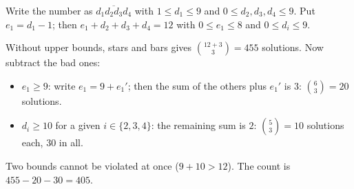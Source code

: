 Write the number as $\overline{d_1d_2d_3d_4}$ with $1\le d_1\le9$ and $0\le d_2,d_3,d_4\le9$. Put $e_1=d_1-1$; then $e_1+d_2+d_3+d_4=12$ with $0\le e_1\le8$ and $0\le d_i\le9$.

Without upper bounds, stars and bars gives $\binom{12+3}{3}=455$ solutions. Now subtract the bad ones:
\begin{itemize}
\item $e_1\ge9$: write $e_1=9+e_1'$; then the sum of the others plus $e_1'$ is $3$: $\binom{6}{3}=20$ solutions.
\item $d_i\ge10$ for a given $i\in\{2,3,4\}$: the remaining sum is $2$: $\binom{5}{3}=10$ solutions each, $30$ in all.
\end{itemize}
Two bounds cannot be violated at once ($9+10>12$). The count is $455-20-30=\boxed{405}$.
